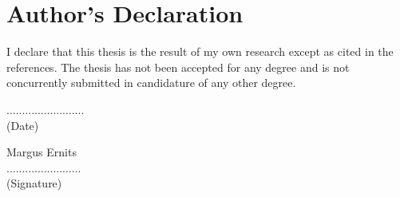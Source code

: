 \clearpage
\chapter*{Author’s Declaration}
\label{declaration}
\thispagestyle{empty}

I declare that this thesis is the result of my own research except as cited in the references. 
The thesis has not been accepted for any degree and is not concurrently submitted in candidature 
of any other degree.
\\
[2cm]

\begin{minipage}{0.5\textwidth}
	\begin{flushleft}
		......................... \\
		(Date) 
	\end{flushleft}
\end{minipage}
\begin{minipage}{0.5\textwidth}
	\begin{flushright}
	Margus Ernits \\
	........................ \\
	(Signature) 
	\end{flushright}
\end{minipage}
